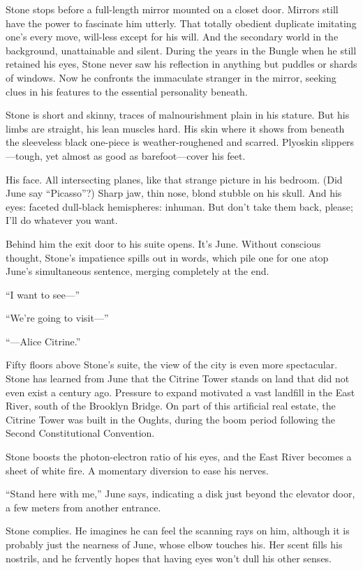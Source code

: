Stone stops before a full-length mirror mounted on a closet door. Mirrors still have the power to fascinate him utterly. That totally obedient duplicate imitating one’s every move, will-less except for his will. And the secondary world in the background, unattainable and silent. During the years in the Bungle when he still retained his eyes, Stone never saw his reflection in anything but puddles or shards of windows. Now he confronts the immaculate stranger in the mirror, seeking clues in his features to the essential personality beneath.

Stone is short and skinny, traces of malnourishment plain in his stature. But his limbs are straight, his lean muscles hard. His skin where it shows from beneath the sleeveless black one-piece is weather-roughened and scarred. Plyoskin slippers—tough, yet almost as good as barefoot—cover his feet.

His face. All intersecting planes, like that strange picture in his bedroom. (Did June say “Picasso”?) Sharp jaw, thin nose, blond stubble on his skull. And his eyes: faceted dull-black hemispheres: inhuman. But don’t take them back, please; I’ll do whatever you want.

Behind him the exit door to his suite opens. It’s June. Without conscious thought, Stone’s impatience spills out in words, which pile one for one atop June’s simultaneous sentence, merging completely at the end.

“I want to see—”

“We’re going to visit—”

“—Alice Citrine.”

Fifty floors above Stone’s suite, the view of the city is even more spectacular. Stone has learned from June that the Citrine Tower stands on land that did not even exist a century ago. Pressure to expand motivated a vast landfill in the East River, south of the Brooklyn Bridge. On part of this artificial real estate, the Citrine Tower was built in the Oughts, during the boom period following the Second Constitutional Convention.

Stone boosts the photon-electron ratio of his eyes, and the East River becomes a sheet of white fire. A momentary diversion to ease his nerves.

“Stand here with me,” June says, indicating a disk just beyond thc elevator door, a few meters from another entrance.

Stone complies. He imagines he can feel the scanning rays on him, although it is probably just the nearness of June, whose elbow touches his. Her scent fills his nostrils, and he fcrvently hopes that having eyes won’t dull his other senses.

